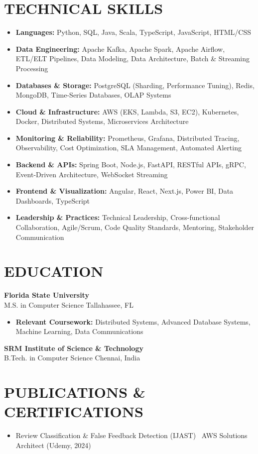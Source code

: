 \documentclass[letterpaper,10pt]{article}
\newcommand{\resumeItem}[1]{\item\small #1}
\newcommand{\resumeSubheading}[4]{
  \vspace{6pt}
  \noindent
  \textbf{#1} \hfill {\footnotesize #2} \\
  [-1pt]
  \noindent
  \small #3 \hfill {\small #4}
  \vspace{3pt}
}
\newcommand{\resumeItemsStart}{\vspace{-2pt}\begin{itemize}}
\newcommand{\resumeItemsEnd}{\end{itemize}\vspace{6pt}}
\begin{document}
\section{\textcolor{metablue}{TECHNICAL SKILLS}}
\vspace{-5pt}
\small
\begin{itemize}
\resumeItem{\textbf{Languages:} Python, SQL, Java, Scala, TypeScript, JavaScript, HTML/CSS}
\resumeItem{\textbf{Data Engineering:} Apache Kafka, Apache Spark, Apache Airflow, ETL/ELT Pipelines, Data Modeling, Data Architecture, Batch \& Streaming Processing}
\resumeItem{\textbf{Databases \& Storage:} PostgreSQL (Sharding, Performance Tuning), Redis, MongoDB, Time-Series Databases, OLAP Systems}
\resumeItem{\textbf{Cloud \& Infrastructure:} AWS (EKS, Lambda, S3, EC2), Kubernetes, Docker, Distributed Systems, Microservices Architecture}
\resumeItem{\textbf{Monitoring \& Reliability:} Prometheus, Grafana, Distributed Tracing, Observability, Cost Optimization, SLA Management, Automated Alerting}
\resumeItem{\textbf{Backend \& APIs:} Spring Boot, Node.js, FastAPI, RESTful APIs, gRPC, Event-Driven Architecture, WebSocket Streaming}
\resumeItem{\textbf{Frontend \& Visualization:} Angular, React, Next.js, Power BI, Data Dashboards, TypeScript}
\resumeItem{\textbf{Leadership \& Practices:} Technical Leadership, Cross-functional Collaboration, Agile/Scrum, Code Quality Standards, Mentoring, Stakeholder Communication}
\end{itemize}
\vspace{-10pt}

\section{\textcolor{metablue}{EDUCATION}}
\vspace{-10pt}
\resumeSubheading
{Florida State University}{}
{M.S. in Computer Science}{Tallahassee, FL}
\resumeItemsStart
\resumeItem{\textbf{Relevant Coursework:} Distributed Systems, Advanced Database Systems, Machine Learning, Data Communications}
\resumeItemsEnd
\vspace{-5pt}
\resumeSubheading
{SRM Institute of Science \& Technology}{}
{B.Tech. in Computer Science}{Chennai, India}
\vspace{-10pt}

\section{\textcolor{metablue}{PUBLICATIONS \& CERTIFICATIONS}}
\vspace{-5pt}
\begin{itemize}
\resumeItem{Review Classification \& False Feedback Detection (IJAST) \textbar\ AWS Solutions Architect (Udemy, 2024)}
\end{itemize}
\end{document}
